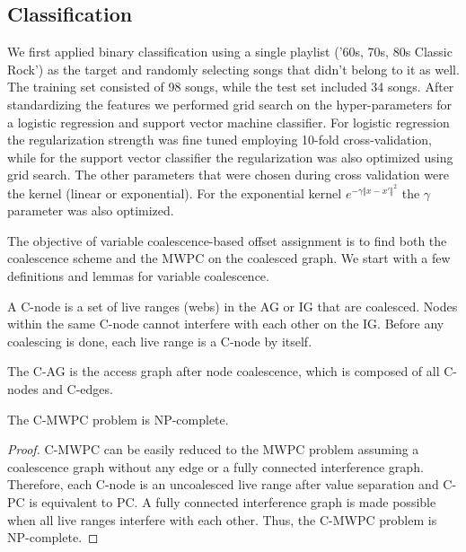 \documentclass[acmtog, authorversion]{acmart}
\begin{document}
\subsection{Classification}

We first applied binary classification using a single playlist ('60s, 70s, 80s Classic Rock') as the target and randomly selecting songs that didn't belong to it as well. The training set consisted of 98 songs, while the test set included 34 songs. After standardizing the features we performed grid search on the hyper-parameters for a logistic regression and support vector machine classifier. For logistic regression the regularization strength was fine tuned employing 10-fold cross-validation, while for the support vector classifier the regularization was also optimized using grid search. The other parameters that were chosen during cross validation were the kernel (linear or exponential). For the exponential kernel $e^{-\gamma {\Vert x -x' \Vert}^{2}}$ the $\gamma$ parameter was also optimized. 


The objective of variable coalescence-based offset assignment is to find
both the coalescence scheme and the MWPC on the coalesced graph. We start
with a few definitions and lemmas for variable coalescence.

\begin{definition}A C-node is a set of
live ranges (webs) in the AG or IG that are coalesced. Nodes within the same
C-node cannot interfere with each other on the IG. Before any coalescing is
done, each live range is a C-node by itself.
\end{definition}

\begin{definition}The C-AG is the access
graph after node coalescence, which is composed of all C-nodes and C-edges.
\end{definition}

\begin{lemma}
The C-MWPC problem is NP-complete.
\end{lemma}
\begin{proof} C-MWPC can be easily reduced to the MWPC problem assuming a
coalescence graph without any edge or a fully connected interference graph.
Therefore, each C-node is an uncoalesced live range after value separation
and C-PC is equivalent to PC. A fully connected interference graph is made
possible when all live ranges interfere with each other. Thus, the C-MWPC
problem is NP-complete.
\end{proof}
\end{document}
